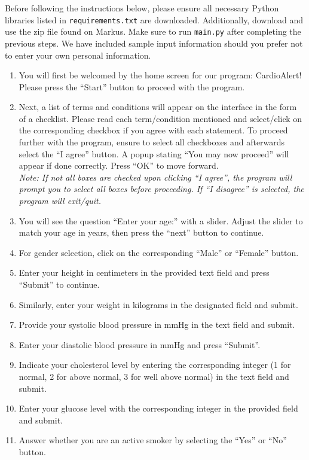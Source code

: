 ﻿\documentclass[12pt]{article}
\begin{document}
Before following the instructions below, please ensure all necessary Python libraries listed in \texttt{requirements.txt} are downloaded. Additionally, download and use the zip file found on Markus. Make sure to run \texttt{main.py} after completing the previous steps. We have included sample input information should you prefer not to enter your own personal information.

\begin{enumerate}
    \item You will first be welcomed by the home screen for our program: CardioAlert! Please press the ``Start'' button to proceed with the program.
    \item Next, a list of terms and conditions will appear on the interface in the form of a checklist. Please read each term/condition mentioned and select/click on the corresponding checkbox if you agree with each statement. To proceed further with the program, ensure to select all checkboxes and afterwards select the ``I agree'' button. A popup stating ``You may now proceed'' will appear if done correctly. Press ``OK'' to move forward. \\
    \textit{Note: If not all boxes are checked upon clicking ``I agree'', the program will prompt you to select all boxes before proceeding. If ``I disagree'' is selected, the program will exit/quit.}
    \item You will see the question ``Enter your age:'' with a slider. Adjust the slider to match your age in years, then press the ``next'' button to continue.
    \item For gender selection, click on the corresponding ``Male'' or ``Female'' button.
    \item Enter your height in centimeters in the provided text field and press ``Submit'' to continue.
    \item Similarly, enter your weight in kilograms in the designated field and submit.
    \item Provide your systolic blood pressure in mmHg in the text field and submit.
    \item Enter your diastolic blood pressure in mmHg and press ``Submit''.
    \item Indicate your cholesterol level by entering the corresponding integer (1 for normal, 2 for above normal, 3 for well above normal) in the text field and submit.
    \item Enter your glucose level with the corresponding integer in the provided field and submit.
    \item Answer whether you are an active smoker by selecting the ``Yes'' or ``No'' button.

\end{enumerate}
\end{document}
